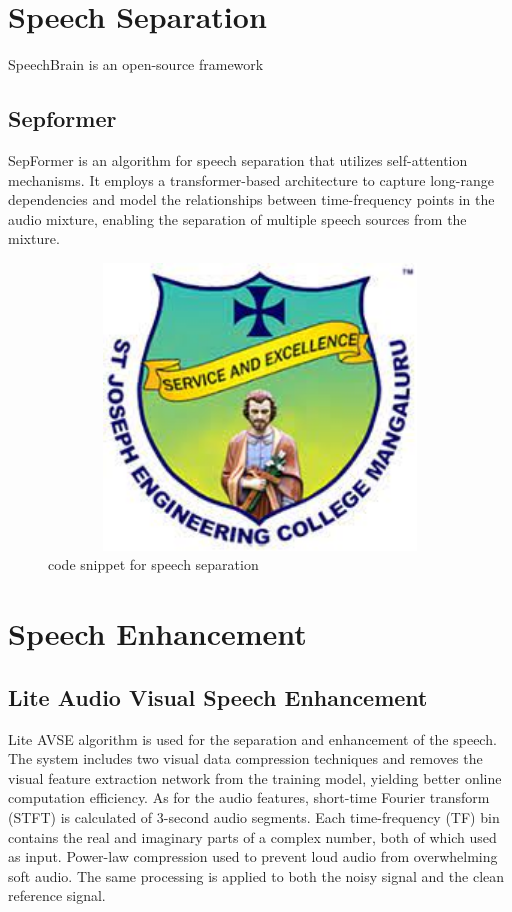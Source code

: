 \documentclass[12pt,a4paper]{report}
\begin{document}
\section{Speech Separation}
\par SpeechBrain is an open-source framework 

\subsection{Sepformer}
\par SepFormer is an algorithm for speech separation that utilizes self-attention mechanisms. It employs a transformer-based architecture to capture long-range dependencies and model the relationships between time-frequency points in the audio mixture, enabling the separation of multiple speech sources from the mixture.


\begin{figure}[hbtp]
\centering
\includegraphics[width=5in,height=3in]{./pic/sjeclogo.png}
\caption{code snippet for speech separation}
\end{figure}

\section{Speech Enhancement}
\subsection{Lite Audio Visual Speech Enhancement}
\par
Lite AVSE algorithm is used for the separation and enhancement of the speech. The system 
includes two visual data compression techniques and removes the visual feature extraction 
network from the training model, yielding better online computation efficiency. As for the audio 
features, short-time Fourier transform (STFT) is calculated of 3-second audio segments. Each 
time-frequency (TF) bin contains the real and imaginary parts of a complex number, both of 
which used as input. Power-law compression used to prevent loud audio from overwhelming soft 
audio. The same processing is applied to both the noisy signal and the clean reference signal.
\end{document}
